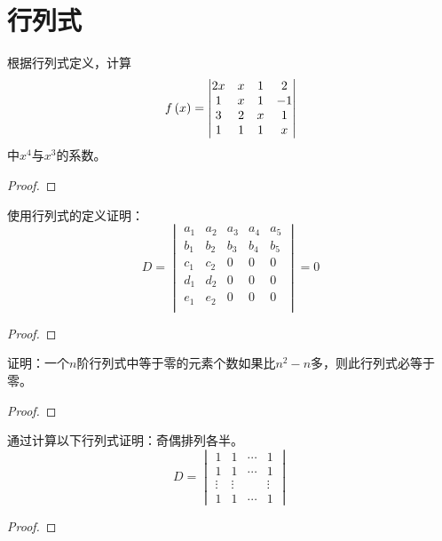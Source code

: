 \section{行列式}

\begin{problem}
根据行列式定义，计算
\begin{equation*}
    f\left( x \right)=
    \begin{vmatrix}
        2x & x & 1 & 2  \\
        1  & x & 1 & -1 \\
        3  & 2 & x & 1  \\
        1  & 1 & 1 & x
    \end{vmatrix}
\end{equation*}
中\(x^4\)与\(x^3\)的系数。
\end{problem}
\begin{proof}
\end{proof}

\begin{problem}
使用行列式的定义证明：
\begin{equation*}
    D=
    \begin{vmatrix}
        a_1 & a_2 & a_3 & a_4 & a_5 \\
        b_1 & b_2 & b_3 & b_4 & b_5 \\
        c_1 & c_2 & 0   & 0   & 0   \\
        d_1 & d_2 & 0   & 0   & 0   \\
        e_1 & e_2 & 0   & 0   & 0   \\
    \end{vmatrix}=0
\end{equation*}
\end{problem}
\begin{proof}
\end{proof}

\begin{problem}
证明：一个\(n\)阶行列式中等于零的元素个数如果比\(n^2-n\)多，则此行列式必等于零。
\end{problem}
\begin{proof}
\end{proof}

\begin{problem}
通过计算以下行列式证明：奇偶排列各半。
\begin{equation*}
    D=
    \begin{vmatrix}
        1      & 1      & \cdots & 1      \\
        1      & 1      & \cdots & 1      \\
        \vdots & \vdots &        & \vdots \\
        1      & 1      & \cdots & 1
    \end{vmatrix}
\end{equation*}
\end{problem}
\begin{proof}
\end{proof}


